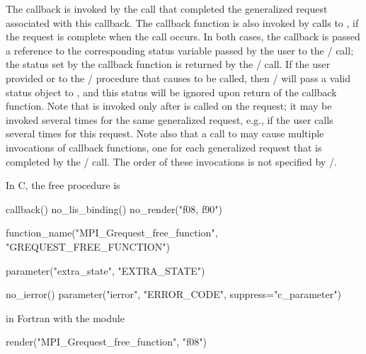 The  callback is invoked by the 
% 
% 
% 
% 
% 
%
%
%
 call that
completed the generalized request associated with this callback.  
The callback function
is also 
invoked by calls to , if the request is
complete when the call occurs.  In 
both
cases, the callback is passed a reference to the corresponding status variable
passed by the user to the \MPI/ call; the status set by the callback
function is returned by the \MPI/ call. 
If the user provided  or
 to the \MPI/ procedure that causes
 to be called, then \MPI/ will pass
a valid status object to , and this status will be
ignored upon return of the callback function.  
Note that 
is invoked only after 
 is called on the request; 
it may be invoked several times for
the same generalized request, e.g., if the user calls
 several times for this request.
Note also that a call to 
%
%
%
%
 may cause multiple
invocations of
 callback functions, one for each
generalized request that is completed by the \MPI/ call.  The order of
these invocations is not specified by \mpi/.

In C, the free procedure is

\begin{mpi-binding}
    callback()
    no_lis_binding()
    no_render("f08, f90")
    
    function_name("MPI_Grequest_free_function", "GREQUEST_FREE_FUNCTION")
    
    parameter("extra_state", "EXTRA_STATE")
    
    no_ierror()
    parameter("ierror", "ERROR_CODE", suppress="c_parameter")
\end{mpi-binding}

\par\noindent
in Fortran with the  module

\begin{mpi-binding}
    render("MPI_Grequest_free_function", "f08")
\end{mpi-binding}

